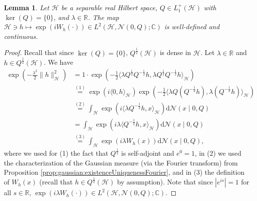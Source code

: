 \documentclass[10pt,a4paper]{amsart}
\newtheorem{lemma}{Lemma}
\newcommand{\C}{\mathbb{C}}
\newcommand{\Normal}{\mathcal{N}}
\newcommand{\R}{\mathbb{R}}
\newcommand{\hs}[1]{\mathcal{#1}} %
\newcommand{\stp}[2]{{\overset{(#2)}{#1}}}
\newcommand{\stpx}[1]{{(#1)}}
\begin{document}
\begin{lemma}
Let $\hs{H}$ be a separable real Hilbert space, $Q\in L_1^+(\hs{H})$ with $\ker(Q)=\{0\}$, and $\lambda\in\R$.
The map $\hs{H}\ni h \mapsto \exp(i W_h(\cdot)) \in L^2(\hs{H},\Normal(0,Q);\C)$ is well-defined and continuous.
\end{lemma}

\begin{proof}
Recall that since $\ker(Q)=\{0\}$, $Q^\frac12(\hs{H})$ is dense in $\hs{H}$.
Let $\lambda\in\R$ and $h\in Q^{\frac12}(\hs{H})$. We have
\begin{align*}
    \exp\left(-\frac{\lambda^2}{2}\|h\|_\hs{H}^2\right)
    & = 1 \cdot \exp\left(-\frac{1}{2}\langle \lambda Q^{\frac12}Q^{-\frac12}h, \lambda Q^{\frac12}Q^{-\frac12}h \rangle_\hs{H}\right)  \\
    & \stp{=}{1} \exp(i \langle 0, h\rangle_\hs{H}) 
        \exp\left(-\frac{1}{2}\langle \lambda Q \left(Q^{-\frac12}h\right), \lambda \left(Q^{-\frac12}h\right) \rangle_\hs{H}\right) \\
    & \stp{=}{2} \int_\hs{H} \exp(i\langle  \lambda Q^{-\frac12}h, x \rangle_\hs{H})\mathrm{d}\Normal(x\mid 0, Q) \\
    & = \int_\hs{H} \exp(i\lambda \langle Q^{-\frac12}h, x \rangle_\hs{H})\mathrm{d}\Normal(x\mid 0, Q) \\
    & \stp{=}{3} \int_\hs{H} \exp(i\lambda W_h(x))\mathrm{d}\Normal(x\mid 0, Q),
\end{align*}
where we used for \stpx{1} the fact that $Q^{\frac12}$ is self-adjoint and $e^0=1$,
in \stpx{2} we used the characterization of the Gaussian measure (via the Fourier transform) from Proposition \ref{prop:gaussian:existenceUniquenessFourier},
and in \stpx{3} the definition of $W_h(x)$ (recall that $h\in Q^{\frac12}(\hs{H})$ by assumption).
Note that since $|e^{is}|=1$ for all $s\in\R$, $\exp(i \lambda W_h(\cdot))\in L^2(\hs{H},\Normal(0,Q);\C)$.


\end{proof}
\end{document}
